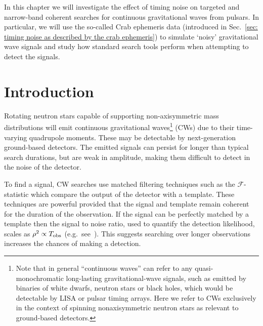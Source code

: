 \documentclass[../full_thesis/full_thesis.tex]{subfiles}
\begin{document}
In this chapter we will investigate the effect of timing noise on targeted and
narrow-band coherent searches for continuous gravitational waves from pulsars.
In particular, we will use the so-called Crab ephemeris data (introduced in
Sec.~\ref{sec: timing noise as described by the crab ephemeris}) to simulate
`noisy' gravitational wave signals and study how standard search tools perform
when attempting to detect the signals.

\section{Introduction}
\label{sec: narrow-band introduction}
Rotating neutron stars capable of supporting non-axisymmetric mass
distributions will emit continuous gravitational
waves\footnote{Note that in general ``continuous waves'' can
    refer to any quasi-monochromatic long-lasting gravitational-wave
        signals, such as emitted by binaries of white dwarfs, neutron
        stars or black holes, which would be detectable by LISA or pulsar
        timing arrays. Here we refer to CWs exclusively in the context of
        spinning nonaxisymmetric neutron stars as relevant to ground-based
        detectors.}
(CWs) due to their
time-varying quadrupole moments. These may be detectable by next-generation ground-based detectors. The emitted
signals can persist for longer than
typical search durations, but are weak in amplitude, making them difficult to detect
in the noise of the detector.

To find a signal, CW searches use matched
filtering techniques such as the $\mathcal{F}$-statistic \citep{Jaranowski1998}
which compare the output of the detector with a template.  These techniques are
powerful provided that the signal and template remain coherent for the duration
of the observation. If the signal can be perfectly matched by a template then
the signal to noise ratio, used to quantify the detection likelihood, scales as
$\rho^{2} \propto T_{\textrm{obs}}$ (e.g.\ see~\citep{Prix2009}). This suggests searching
over longer observations increases the chances of making a detection.
\end{document}
